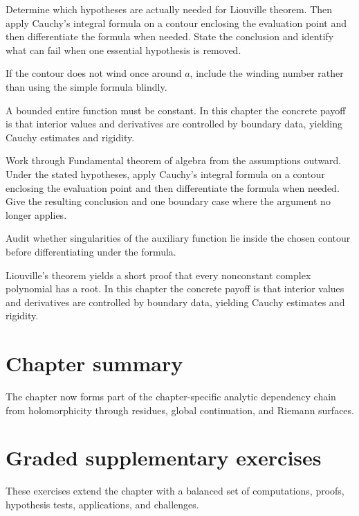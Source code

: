 \begin{exercise}\label{exr:iv06-07}
Determine which hypotheses are actually needed for Liouville theorem. Then apply Cauchy's integral formula on a contour enclosing the evaluation point and then differentiate the formula when needed. State the conclusion and identify what can fail when one essential hypothesis is removed.
\end{exercise}
\begin{hint}
If the contour does not wind once around \(a\), include the winding number rather than using the simple formula blindly.
\end{hint}
\begin{solution}
A bounded entire function must be constant. In this chapter the concrete payoff is that interior values and derivatives are controlled by boundary data, yielding Cauchy estimates and rigidity.
\end{solution}

\begin{exercise}\label{exr:iv06-08}
Work through Fundamental theorem of algebra from the assumptions outward. Under the stated hypotheses, apply Cauchy's integral formula on a contour enclosing the evaluation point and then differentiate the formula when needed. Give the resulting conclusion and one boundary case where the argument no longer applies.
\end{exercise}
\begin{hint}
Audit whether singularities of the auxiliary function lie inside the chosen contour before differentiating under the formula.
\end{hint}
\begin{solution}
Liouville's theorem yields a short proof that every nonconstant complex polynomial has a root. In this chapter the concrete payoff is that interior values and derivatives are controlled by boundary data, yielding Cauchy estimates and rigidity.
\end{solution}

\section*{Chapter summary}
The chapter now forms part of the chapter-specific analytic dependency chain from holomorphicity through residues, global continuation, and Riemann surfaces.
\section{Graded supplementary exercises}
These exercises extend the chapter with a balanced set of computations, proofs, hypothesis tests, applications, and challenges.

